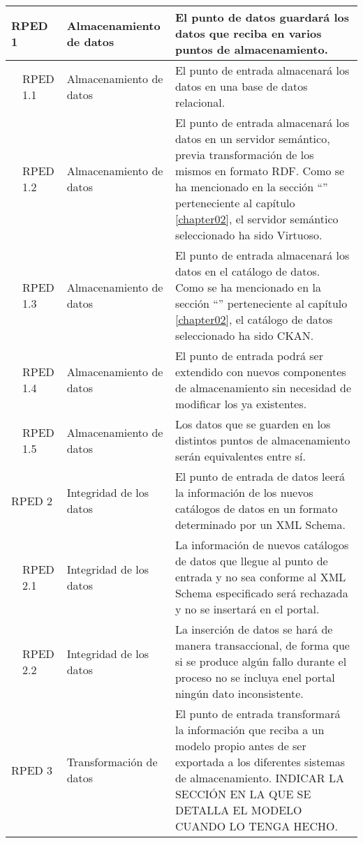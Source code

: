 \begin{longtable}[c]{|p{1mm}|p{14mm}|p{30mm}|p{90mm}|}
\multicolumn{2}{|l|}{RPED 1}  & Almacenamiento de datos & El punto de datos guardará los datos que reciba en varios puntos de almacenamiento. \\
\hline
& RPED 1.1 & Almacenamiento de datos & El punto de entrada almacenará los datos en una base de datos relacional. \\
\hline
& RPED 1.2 & Almacenamiento de datos & El punto de entrada almacenará los datos en un servidor semántico, previa transformación de los mismos en formato RDF.   Como se ha mencionado en la sección ``\nameref{chapter02:alternativas_seleccionadas}'' perteneciente al capítulo \ref{chapter02}, el servidor semántico seleccionado ha sido Virtuoso.\\
\hline
& RPED 1.3 & Almacenamiento de datos & El punto de entrada almacenará los datos en el catálogo de datos.  Como se ha mencionado en la sección ``\nameref{chapter02:alternativas_seleccionadas}'' perteneciente al capítulo \ref{chapter02}, el catálogo de datos seleccionado ha sido CKAN. \\
\hline
& RPED 1.4 & Almacenamiento de datos & El punto de entrada podrá ser extendido con nuevos componentes de almacenamiento sin necesidad de modificar los ya existentes. \\
\hline
& RPED 1.5 & Almacenamiento de datos & Los datos que se guarden en los distintos puntos de almacenamiento serán equivalentes entre sí. \\
\hline
\multicolumn{2}{|l|}{RPED 2}  & Integridad de los datos & El punto de entrada de datos leerá la información de los nuevos catálogos de datos en un formato determinado por un XML Schema. \\
\hline
& RPED 2.1 & Integridad de los datos & La información de nuevos catálogos de datos que llegue al punto de entrada y no sea conforme al XML Schema especificado será rechazada y no se insertará en el portal. \\
\hline
& RPED 2.2 & Integridad de los datos & La inserción de datos se hará de manera transaccional, de forma que si se produce algún fallo durante el proceso no se incluya enel portal ningún dato inconsistente. \\
\hline
\multicolumn{2}{|l|}{RPED 3}  & Transformación de datos & El punto de entrada transformará la información que reciba a un modelo propio antes de ser exportada a los diferentes sistemas de almacenamiento.  INDICAR LA SECCIÓN EN LA QUE SE DETALLA EL MODELO CUANDO LO TENGA HECHO. \\
\hline
\hline

 \end{longtable}
 
 
 
 
 
 
 
 
 
 
 
 
 
 
 
 
 
 
 
 
 